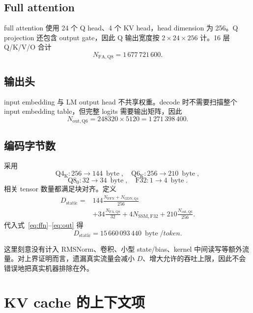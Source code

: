 \documentclass[11pt,a4paper]{ctexart}
\newcommand{\bytes}{\operatorname{byte}}
\begin{document}
\subsection{Full attention}
full attention 使用 24 个 Q head、4 个 KV head，head dimension 为 256。Q projection 还包含 output gate，因此 Q 输出宽度按 $2\times24\times256$ 计。16 层 Q/K/V/O 合计
\begin{equation}
  N_{\mathrm{FA,Q8}}=1\,677\,721\,600.
  \label{eq:fa}
\end{equation}

\subsection{输出头}
input embedding 与 LM output head 不共享权重。decode 时不需要扫描整个 input embedding table，但完整 logits 需要输出矩阵，因此
\begin{equation}
  N_{\mathrm{out,Q6}}=248320\times5120
  =1\,271\,398\,400.
  \label{eq:out}
\end{equation}

\subsection{编码字节数}
采用
\[
\mathrm{Q4_K}:256\to144\ \bytes,
\quad
\mathrm{Q6_K}:256\to210\ \bytes,
\]
\[
\mathrm{Q8_0}:32\to34\ \bytes,
\quad
\mathrm{F32}:1\to4\ \bytes.
\]
相关 tensor 数量都满足块对齐。定义
\begin{equation}
\begin{aligned}
D_{\mathrm{static}}
={}&144\frac{N_{\mathrm{FFN}}+N_{\mathrm{GDN,Q4}}}{256}\\
&+34\frac{N_{\mathrm{FA,Q8}}}{32}
+4N_{\mathrm{SSM,F32}}
+210\frac{N_{\mathrm{out,Q6}}}{256}.
\end{aligned}
\label{eq:static}
\end{equation}
代入式~\eqref{eq:ffn}--\eqref{eq:out} 得
\begin{equation}
  \boxed{D_{\mathrm{static}}=15\,660\,093\,440\ \bytes/token}.
  \label{eq:staticvalue}
\end{equation}

这里刻意没有计入 RMSNorm、卷积、小型 state/bias、kernel 中间读写等额外流量。对上界证明而言，遗漏真实流量会减小 $D$、增大允许的吞吐上限，因此不会错误地把真实机器排除在外。

\section{KV cache 的上下文项}
\end{document}

